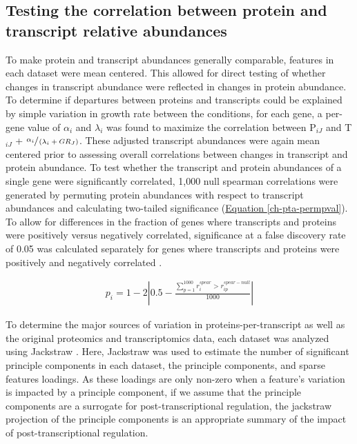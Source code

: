 \subsection{Testing the correlation between protein and transcript relative abundances}

To make protein and transcript abundances generally comparable, features in each dataset were mean centered. This allowed for direct testing of whether changes in transcript abundance were reflected in changes in protein abundance.  To determine if departures between proteins and transcripts could be explained by simple variation in growth rate between the conditions, for each gene, a per-gene value of $\alpha_{i}$ and $\lambda_{i}$ was found to maximize  the correlation between P$_{iJ}$ and T$_{iJ}$ + $\sfrac{\alpha_{i}}{\left(\lambda_{i} + GR_{J}\right)}$.  These adjusted transcript abundances were again mean centered prior to assessing overall correlations between changes in transcript and protein abundance. To test whether the transcript and protein abundances of a single gene were significantly correlated, 1,000 null spearman correlations were generated by permuting protein abundances with respect to transcript abundances and calculating two-tailed significance (\hyperref[ch-pta-permpval]{Equation \ref{ch-pta-permpval}}). To allow for differences in the fraction of genes where transcripts and proteins were positively versus negatively correlated, significance at a false discovery rate of 0.05 was calculated separately for genes where transcripts and proteins were positively and negatively correlated \cite{Storey:2003cj}.

\begin{align}
p_{i} = 1 - 2\left|0.5 - \frac{\sum_{p = 1}^{1000}r^{spear}_{i} > r_{ip}^{spear-null}}{1000}\label{ch-pta-permpval}\right|
\end{align}

To determine the major sources of variation in proteins-per-transcript as well as the original proteomics and transcriptomics data, each dataset was analyzed using Jackstraw \cite{Chung:2015bq}. Here, Jackstraw was used to estimate the number of significant principle components in each dataset, the principle components, and sparse features loadings. As these loadings are only non-zero when a feature's variation is impacted by a principle component, if we assume that the principle components are a surrogate for post-transcriptional regulation, the jackstraw projection of the principle components is an appropriate summary of the impact of post-transcriptional regulation.

